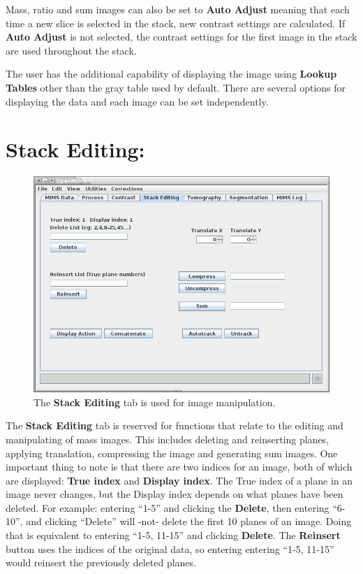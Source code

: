 \documentclass{article}
\begin{document}
	Mass, ratio and sum images can also be set to \textbf{Auto Adjust} meaning that
	each time a new slice is selected in the stack, new contrast settings are calculated.
	If \textbf{Auto Adjust} is not selected, the contrast settings for the first image
	in the stack are used throughout the stack.

	The user has the additional capability of displaying the image using \textbf{Lookup
	Tables} other than the gray table used by default. There are several options for
	displaying the data and each image can be set independently.


\newpage 
\section*{Stack Editing:}
	
	\begin{figure}[h]
	\centering
	\includegraphics[scale=0.65]{snapshot_MimsStackEditing.png}
	\caption{The \textbf{Stack Editing} tab is used for image manipulation.}
	\end{figure}
	
	The \textbf{Stack Editing} tab is reserved for functions that relate to the editing
	and manipulating of mass images. This includes deleting and reinserting planes,
	applying translation, compressing the image and generating sum images. 
	One important thing to note is that there
	are two indices for an image, both of which are displayed: \textbf{True index} and 
	\textbf{Display index}. The True index of a
	plane in an image never changes, but the Display index depends on what planes have been deleted. For
	example: entering “1-5” and clicking the \textbf{Delete}, then entering “6-10”, 
	and clicking “Delete” will -not- delete the first 10
	planes of an image. Doing that is equivalent to entering “1-5, 11-15” and clicking \textbf{Delete}. 
	The \textbf{Reinsert} button uses the indices of the original data, so entering
	entering “1-5, 11-15” would reinsert the previously deleted planes.
	
\end{document}
